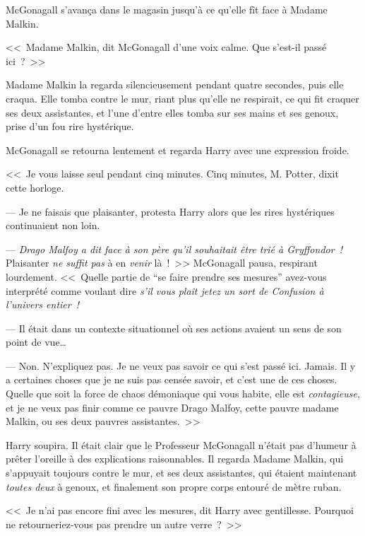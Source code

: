 McGonagall s'avança dans le magasin jusqu'à ce qu'elle fît face à Madame Malkin.

<<~Madame Malkin, dit McGonagall d'une voix calme. Que s'est-il passé ici~?~>>

Madame Malkin la regarda silencieusement pendant quatre secondes, puis elle craqua. Elle tomba contre le mur, riant plus qu'elle ne respirait, ce qui fit craquer ses deux assistantes, et l'une d'entre elles tomba sur ses mains et ses genoux, prise d'un fou rire hystérique.

McGonagall se retourna lentement et regarda Harry avec une expression froide. 

<<~Je vous laisse seul pendant cinq minutes. Cinq minutes, M. Potter, dixit cette horloge.

--- Je ne faisais que plaisanter, protesta Harry alors que les rires hystériques continuaient non loin.

--- \emph{Drago Malfoy a dit face à son père qu'il souhaitait être trié à Gryffondor~!} Plaisanter \emph{ne suffit pas} à en \emph{venir} là~!~>> McGonagall pausa, respirant lourdement. <<~Quelle partie de “se faire prendre ses mesures” avez-vous interprété comme voulant dire \emph{s'il vous plaît jetez un sort de Confusion à l'univers entier~!}

--- Il était dans un contexte situationnel où ses actions avaient un sens de son point de vue…

--- Non. N'expliquez pas. Je ne veux pas savoir ce qui s'est passé ici. Jamais. Il y a certaines choses que je ne suis pas censée savoir, et c'est une de ces choses. Quelle que soit la force de chaos démoniaque qui vous habite, elle est \emph{contagieuse}, et je ne veux pas finir comme ce pauvre Drago Malfoy, cette pauvre madame Malkin, ou ses deux pauvres assistantes.~>>

Harry soupira. Il était clair que le Professeur McGonagall n'était pas d'humeur à prêter l'oreille à des explications raisonnables. Il regarda Madame Malkin, qui s'appuyait toujours contre le mur, et ses deux assistantes, qui étaient maintenant \emph{toutes deux} à genoux, et finalement son propre corps entouré de mètre ruban.

<<~Je n'ai pas encore fini avec les mesures, dit Harry avec gentillesse. Pourquoi ne retourneriez-vous pas prendre un autre verre~?~>>

